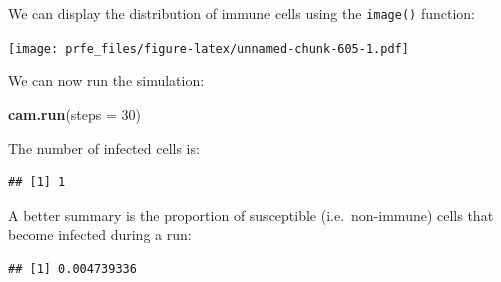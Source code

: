 \documentclass[12pt,a4paper]{book}
\newenvironment{Shaded}{\begin{snugshade}}{\end{snugshade}}
\newcommand{\KeywordTok}[1]{\textcolor[rgb]{0.13,0.29,0.53}{\textbf{#1}}}
\newcommand{\DataTypeTok}[1]{\textcolor[rgb]{0.13,0.29,0.53}{#1}}
\newcommand{\DecValTok}[1]{\textcolor[rgb]{0.00,0.00,0.81}{#1}}
\newcommand{\StringTok}[1]{\textcolor[rgb]{0.31,0.60,0.02}{#1}}
\newcommand{\OtherTok}[1]{\textcolor[rgb]{0.56,0.35,0.01}{#1}}
\newcommand{\OperatorTok}[1]{\textcolor[rgb]{0.81,0.36,0.00}{\textbf{#1}}}
\newcommand{\NormalTok}[1]{#1}
\theoremstyle{definition}
\theoremstyle{definition}
\theoremstyle{definition}
\theoremstyle{remark}
\begin{document}
We can display the distribution of immune cells using the
\texttt{image()} function:

\begin{Shaded}
\end{Shaded}

\texttt{[image: prfe\_files/figure-latex/unnamed-chunk-605-1.pdf]}

We can now run the simulation:

\begin{Shaded}
\begin{Highlighting}[]
\KeywordTok{cam.run}\NormalTok{(}\DataTypeTok{steps =} \DecValTok{30}\NormalTok{)}
\end{Highlighting}
\end{Shaded}

The number of infected cells is:

\begin{Shaded}
\end{Shaded}

\begin{verbatim}
## [1] 1
\end{verbatim}

A better summary is the proportion of susceptible (i.e.~non-immune)
cells that become infected during a run:

\begin{Shaded}
\end{Shaded}

\begin{verbatim}
## [1] 0.004739336
\end{verbatim}
\end{document}
